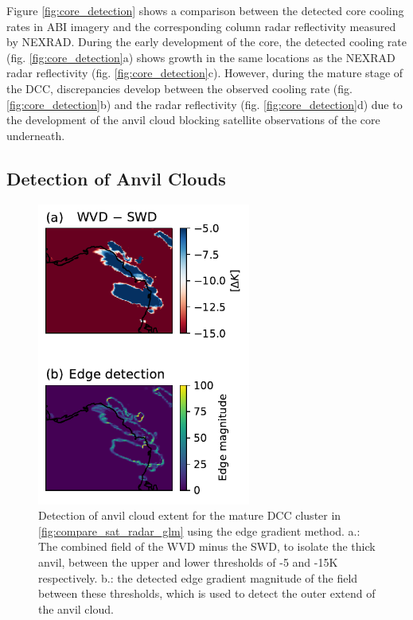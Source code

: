 \documentclass[amt, manuscript]{copernicus}
\begin{document}
Figure \ref{fig:core_detection} shows a comparison between the detected core cooling rates in ABI imagery and the corresponding column radar reflectivity measured by NEXRAD. 
During the early development of the core, the detected cooling rate (fig. \ref{fig:core_detection}a) shows growth in the same locations as the NEXRAD radar reflectivity (fig. \ref{fig:core_detection}c).
However, during the mature stage of the DCC, discrepancies develop between the observed cooling rate (fig.\ref{fig:core_detection}b) and the radar reflectivity (fig. \ref{fig:core_detection}d) due to the development of the anvil cloud blocking satellite observations of the core underneath.

\subsection{Detection of Anvil Clouds}

\begin{figure}[t]
    \includegraphics[width=7cm]{figure07.pdf}
    \caption{Detection of anvil cloud extent for the mature DCC cluster in \ref{fig:compare_sat_radar_glm} using the edge gradient method. a.: The combined field of the WVD minus the SWD, to isolate the thick anvil, between the upper and lower thresholds of -5 and -15\unit{K} respectively. b.: the detected edge gradient magnitude of the field between these thresholds, which is used to detect the outer extend of the anvil cloud.}
    \label{fig:edge_detection}
\end{figure}
\end{document}
